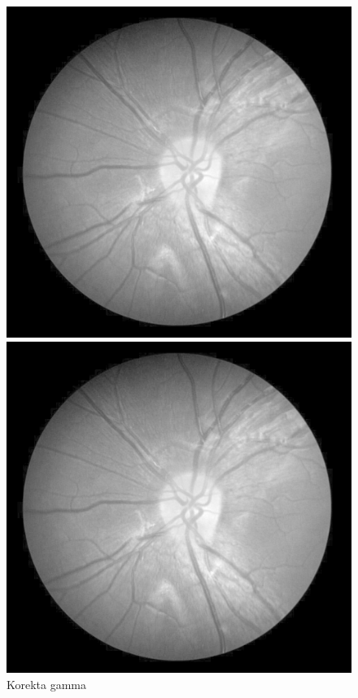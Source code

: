 \documentclass[polish,polish,a4paper]{article}
\begin{document}
		\begin{figure}[!h]
			\centering
			\begin{minipage}{0.3\linewidth}
				\includegraphics[width=\linewidth]{./dane/metoda1/gamma.png}
				\caption*{Korekta gamma}
			\end{minipage}
			\begin{minipage}{0.3\linewidth}
				\includegraphics[width=\linewidth]{./dane/metoda1/exposure.png}

\end{minipage}
\end{figure}
\end{document}
